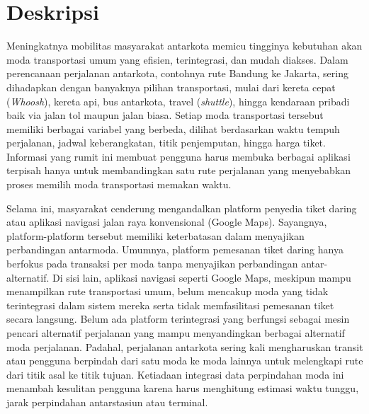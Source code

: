 \documentclass[a4paper,twoside]{article}
\begin{document}
	
	\title{\@judultopik}
	\author{\nama \textendash \@npm} 
	
	\newcommand{\nama}{Edward Efren Christian}
	\newcommand{\@npm}{6182301083}
	\newcommand{\@judultopik}{Mesin Pencari Alternatif Perjalanan} %
	\newcommand{\jumpemb}{1} %
	\newcommand{\tanggal}{16/09/2026}
	
	
	\maketitle
	
	
	\section{Deskripsi}
	Meningkatnya mobilitas masyarakat antarkota memicu tingginya kebutuhan akan moda transportasi umum yang efisien, terintegrasi, dan mudah diakses. Dalam perencanaan perjalanan antarkota, contohnya rute Bandung ke Jakarta, sering dihadapkan dengan banyaknya pilihan transportasi, mulai dari kereta cepat ({\it Whoosh}), kereta api, bus antarkota, travel ({\it shuttle}), hingga kendaraan pribadi baik via jalan tol maupun jalan biasa. Setiap moda transportasi tersebut memiliki berbagai variabel yang berbeda, dilihat berdasarkan waktu tempuh perjalanan, jadwal keberangkatan, titik penjemputan, hingga harga tiket. Informasi yang rumit ini membuat pengguna harus membuka berbagai aplikasi terpisah hanya untuk membandingkan satu rute perjalanan yang menyebabkan proses memilih moda transportasi memakan waktu.
	
	Selama ini, masyarakat cenderung mengandalkan platform penyedia tiket daring atau aplikasi navigasi jalan raya konvensional (Google Maps). Sayangnya, platform-platform tersebut memiliki keterbatasan dalam menyajikan perbandingan antarmoda. Umumnya, platform pemesanan tiket daring hanya berfokus pada transaksi per moda tanpa menyajikan perbandingan antar-alternatif. Di sisi lain, aplikasi navigasi seperti Google Maps, meskipun mampu menampilkan rute transportasi umum, belum mencakup moda yang tidak terintegrasi dalam sistem mereka serta tidak memfasilitasi pemesanan tiket secara langsung. Belum ada platform terintegrasi yang berfungsi sebagai mesin pencari alternatif perjalanan yang mampu menyandingkan berbagai alternatif moda perjalanan. Padahal, perjalanan antarkota sering kali mengharuskan transit atau pengguna berpindah dari satu moda ke moda lainnya untuk melengkapi rute dari titik asal ke titik tujuan. Ketiadaan integrasi data perpindahan moda ini menambah kesulitan pengguna karena harus menghitung estimasi waktu tunggu, jarak perpindahan antarstasiun atau terminal.
	
\end{document}
